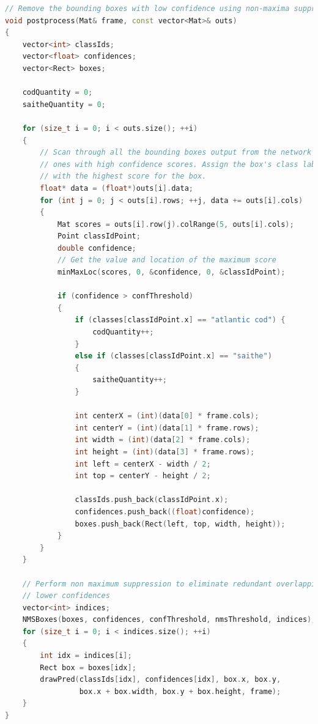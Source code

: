 \begin{lstlisting}[language=C++, caption=main.cpp]
// Remove the bounding boxes with low confidence using non-maxima suppression
void postprocess(Mat& frame, const vector<Mat>& outs)
{
    vector<int> classIds;
    vector<float> confidences;
    vector<Rect> boxes;

    codQuantity = 0;
    saitheQuantity = 0;

    for (size_t i = 0; i < outs.size(); ++i)
    {
        // Scan through all the bounding boxes output from the network and keep only the
        // ones with high confidence scores. Assign the box's class label as the class
        // with the highest score for the box.
        float* data = (float*)outs[i].data;
        for (int j = 0; j < outs[i].rows; ++j, data += outs[i].cols)
        {
            Mat scores = outs[i].row(j).colRange(5, outs[i].cols);
            Point classIdPoint;
            double confidence;
            // Get the value and location of the maximum score
            minMaxLoc(scores, 0, &confidence, 0, &classIdPoint);

            if (confidence > confThreshold)
            {
                if (classes[classIdPoint.x] == "atlantic cod") {
                    codQuantity++;
                }
                else if (classes[classIdPoint.x] == "saithe")
                {
                    saitheQuantity++;
                }

                int centerX = (int)(data[0] * frame.cols);
                int centerY = (int)(data[1] * frame.rows);
                int width = (int)(data[2] * frame.cols);
                int height = (int)(data[3] * frame.rows);
                int left = centerX - width / 2;
                int top = centerY - height / 2;

                classIds.push_back(classIdPoint.x);
                confidences.push_back((float)confidence);
                boxes.push_back(Rect(left, top, width, height));
            }
        }
    }

    // Perform non maximum suppression to eliminate redundant overlapping boxes with
    // lower confidences
    vector<int> indices;
    NMSBoxes(boxes, confidences, confThreshold, nmsThreshold, indices);
    for (size_t i = 0; i < indices.size(); ++i)
    {
        int idx = indices[i];
        Rect box = boxes[idx];
        drawPred(classIds[idx], confidences[idx], box.x, box.y,
                 box.x + box.width, box.y + box.height, frame);
    }
}
\end{lstlisting}

